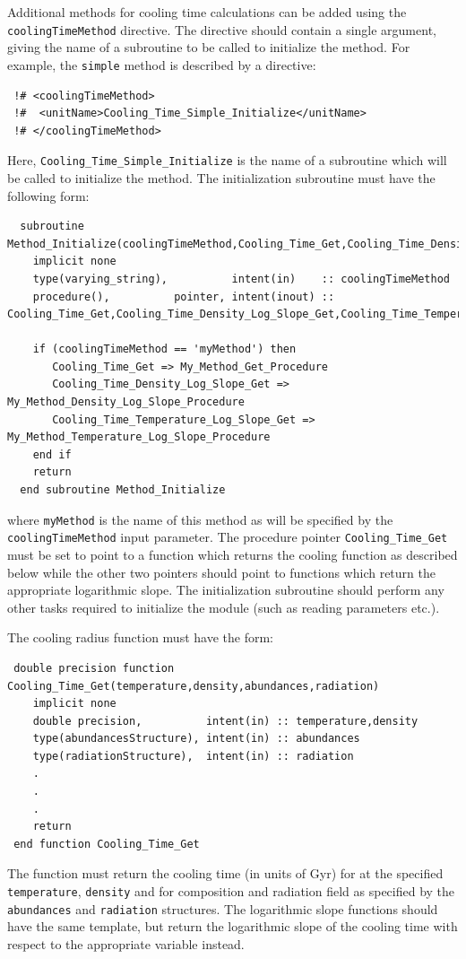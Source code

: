 Additional methods for cooling time calculations can be added using the {\tt coolingTimeMethod} directive. The directive should contain a single argument, giving the name of a subroutine to be called to initialize the method. For example, the {\tt simple} method is described by a directive:
\begin{verbatim}
 !# <coolingTimeMethod>
 !#  <unitName>Cooling_Time_Simple_Initialize</unitName>
 !# </coolingTimeMethod>
\end{verbatim}
Here, {\tt Cooling\_Time\_Simple\_Initialize} is the name of a subroutine which will be called to initialize the method. The initialization subroutine must have the following form:
\begin{verbatim}
  subroutine Method_Initialize(coolingTimeMethod,Cooling_Time_Get,Cooling_Time_Density_Log_Slope_Get,Cooling_Time_Temperature_Log_Slope_Get)
    implicit none
    type(varying_string),          intent(in)    :: coolingTimeMethod
    procedure(),          pointer, intent(inout) :: Cooling_Time_Get,Cooling_Time_Density_Log_Slope_Get,Cooling_Time_Temperature_Log_Slope_Get
    
    if (coolingTimeMethod == 'myMethod') then
       Cooling_Time_Get => My_Method_Get_Procedure
       Cooling_Time_Density_Log_Slope_Get => My_Method_Density_Log_Slope_Procedure
       Cooling_Time_Temperature_Log_Slope_Get => My_Method_Temperature_Log_Slope_Procedure
    end if
    return
  end subroutine Method_Initialize
\end{verbatim}
where {\tt myMethod} is the name of this method as will be specified by the {\tt coolingTimeMethod} input parameter. The procedure pointer {\tt Cooling\_Time\_Get} must be set to point to a function which returns the cooling function as described below while the other two pointers should point to functions which return the appropriate logarithmic slope. The initialization subroutine should perform any other tasks required to initialize the module (such as reading parameters etc.).

The cooling radius function must have the form:
\begin{verbatim}
 double precision function Cooling_Time_Get(temperature,density,abundances,radiation)
    implicit none
    double precision,          intent(in) :: temperature,density
    type(abundancesStructure), intent(in) :: abundances
    type(radiationStructure),  intent(in) :: radiation
    .
    .
    .
    return
 end function Cooling_Time_Get
\end{verbatim}
The function must return the cooling time (in units of Gyr) for at the specified {\tt temperature}, {\tt density} and for composition and radiation field as specified by the {\tt abundances} and {\tt radiation} structures. The logarithmic slope functions should have the same template, but return the logarithmic slope of the cooling time with respect to the appropriate variable instead.

